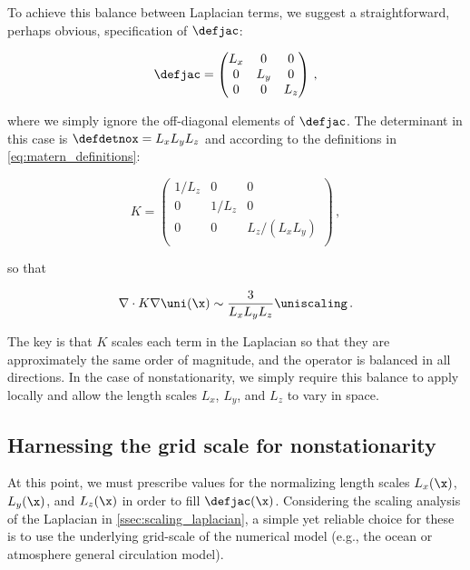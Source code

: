 \documentclass[alpha-refs]{wiley-article}
\begin{document}
To achieve this balance between Laplacian terms, we suggest a straightforward,
perhaps obvious, specification of $\defjac$:
\begin{linenomath*}\begin{equation*}
    \defjac =
        \begin{pmatrix}
            L_x & 0 & 0     \\
            0 & L_y & 0     \\
            0 & 0   & L_z   \\
        \end{pmatrix} \, ,
\end{equation*}\end{linenomath*}
where we simply ignore the off-diagonal elements of $\defjac$.
The determinant in this case is $\defdetnox = L_xL_yL_z$ and
according to the definitions in \cref{eq:matern_definitions}:
\begin{linenomath*}\begin{equation*}
    K =
        \begin{pmatrix}
            1/L_z & 0 & 0     \\
            0 & 1/L_z & 0     \\
            0 & 0   & L_z/(L_xL_y)   \\
        \end{pmatrix} \, ,
\end{equation*}\end{linenomath*}
so that
\begin{linenomath*}\begin{equation*}
    \nabla\cdot K\nabla\uni(\x) \sim \dfrac{3}{L_xL_yL_z}\uniscaling \, .
\end{equation*}\end{linenomath*}
The key is that $K$ scales each term in the Laplacian so that they are
approximately the same order of magnitude, and the operator is balanced in all
directions.
In the case of nonstationarity, we simply require this balance to apply locally
and allow the length scales $L_x$, $L_y$, and $L_z$ to vary in space.


\subsection{Harnessing the grid scale for nonstationarity}
\label{ssec:nonstationarity}

At this point, we must prescribe values for the normalizing length scales
$L_x(\x)$, $L_y(\x)$, and $L_z(\x)$ in order to fill $\defjac(\x)$.
Considering the scaling analysis of the Laplacian in
\cref{ssec:scaling_laplacian}, a simple yet reliable choice for these
is to use the underlying grid-scale of the numerical model (e.g., the ocean or
atmosphere general circulation model).
\end{document}
